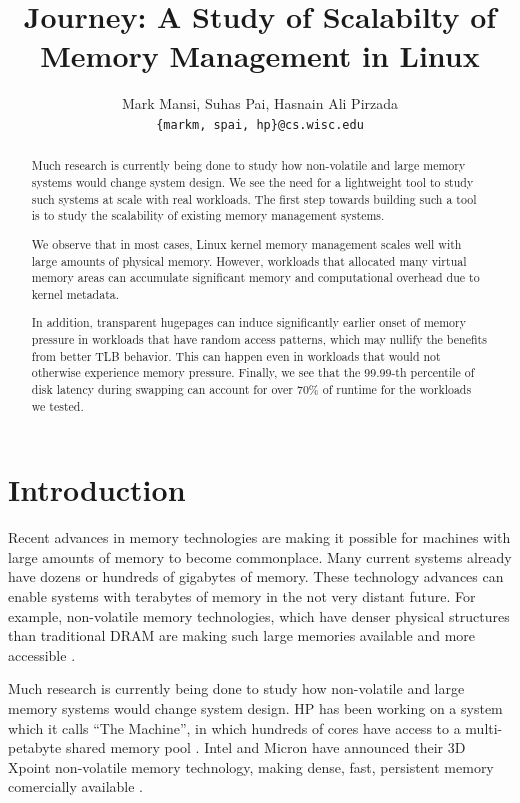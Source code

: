 \documentclass[twocolumn,11pt]{article}
\title{Journey: A Study of Scalabilty of Memory Management in Linux}
\author{Mark Mansi, Suhas Pai, Hasnain Ali Pirzada\\\texttt{\{markm, spai, hp\}@cs.wisc.edu}}
\date{}
\begin{document}
\maketitle

\begin{abstract}
    \small 

Much research is currently being done to study how non-volatile and large memory
    systems would change system design.  We see the need for a lightweight tool
    to study such systems at scale with real workloads.  The first step towards
    building such a tool is to study the scalability of existing memory
    management systems. 

We observe that in most cases, Linux kernel memory management scales well with
    large amounts of physical memory. However, workloads that allocated many
    virtual memory areas can accumulate significant memory and computational
    overhead due to kernel metadata.

In addition, transparent hugepages can induce significantly earlier
    onset of memory pressure in workloads that have random access patterns,
    which may nullify the benefits from better TLB behavior. This can happen
    even in workloads that would not otherwise experience memory pressure.
Finally, we see that the 99.99-th percentile of disk latency during swapping
    can account for over 70\% of runtime for the workloads we tested.

\end{abstract}

\section{Introduction}

Recent advances in memory technologies are making it possible for machines with
large amounts of memory to become commonplace. Many current systems already
have dozens or hundreds of gigabytes of memory. These technology advances can
enable systems with terabytes of memory in the not very distant future. For
example, non-volatile memory technologies, which have denser physical
structures than traditional DRAM are making such large memories available and
more accessible \cite{xpoint}.

Much research is currently being done to study how non-volatile and large
memory systems would change system design. HP has been working on a system
which it calls ``The Machine'', in which hundreds of cores have access to a
multi-petabyte shared memory pool \cite{hp_machine}. Intel and
Micron have announced their 3D Xpoint non-volatile memory technology, making
dense, fast, persistent memory comercially available \cite{xpoint}.
\end{document}
